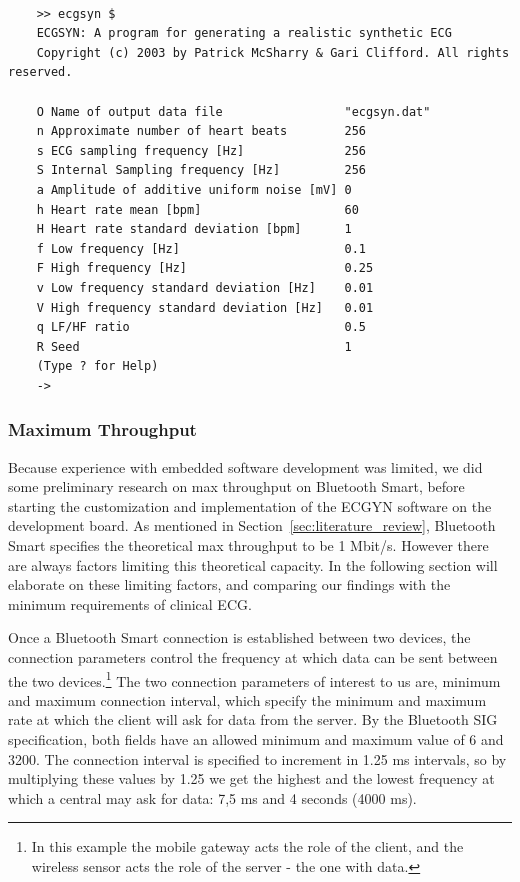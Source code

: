 \begin{lstlisting}[caption={ECGSYN Commando Line Interface (CLI)}, label={lst:ecgsyn:terminal}, basicstyle=\small]

    >> ecgsyn $
    ECGSYN: A program for generating a realistic synthetic ECG
    Copyright (c) 2003 by Patrick McSharry & Gari Clifford. All rights reserved.
     
    O Name of output data file                 "ecgsyn.dat"
    n Approximate number of heart beats        256
    s ECG sampling frequency [Hz]              256
    S Internal Sampling frequency [Hz]         256
    a Amplitude of additive uniform noise [mV] 0
    h Heart rate mean [bpm]                    60
    H Heart rate standard deviation [bpm]      1
    f Low frequency [Hz]                       0.1
    F High frequency [Hz]                      0.25
    v Low frequency standard deviation [Hz]    0.01
    V High frequency standard deviation [Hz]   0.01
    q LF/HF ratio                              0.5
    R Seed                                     1
    (Type ? for Help)
    ->

\end{lstlisting}

\subsubsection{Maximum Throughput} %
\label{ssub:maximum_throughput}

Because experience with embedded software development was limited, we did some preliminary research on max throughput on Bluetooth Smart, before starting the customization and implementation of the ECGYN software on the development board. As mentioned in Section~\ref{sec:literature_review}, Bluetooth Smart specifies the theoretical max throughput to be 1 Mbit/s. However there are always factors limiting this theoretical capacity. In the following section will elaborate on these limiting factors, and comparing our findings with the minimum requirements of clinical ECG.

Once a Bluetooth Smart connection is established between two devices, the connection parameters \cite{newRef:59} control the frequency at which data can be sent between the two devices.\footnote{ In this example the mobile gateway acts the role of the client, and the wireless sensor acts the role of the server - the one with data.} The two connection parameters of interest to us are, minimum and maximum connection interval, which specify the minimum and maximum rate at which the client will ask for data from the server. By the Bluetooth SIG specification, both fields have an allowed minimum and maximum value of 6 and 3200. The connection interval is specified to increment in 1.25 ms intervals, so by multiplying these values by 1.25 we get the highest and the lowest frequency at which a central may ask for data: 7,5 ms and 4 seconds (4000 ms).


